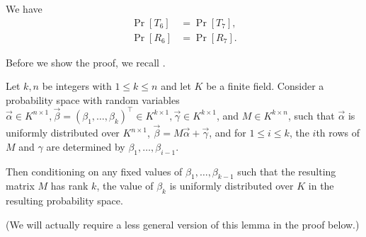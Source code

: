 \begin{lemma} We have
	\label{lem:t6t7}
	\begin{align*}
		\Pr[T_6] &= \Pr[T_7],\\
		\Pr[R_6] &= \Pr[R_7].
	\end{align*}
\end{lemma}

Before we show the proof, we recall \cite[Lemma~9]{cs01}.

\begin{lemma}
	\label{lem:independence}
	Let $k,n$ be integers with $1\leq k\leq n$ and let $K$ be a finite field. Consider a probability space with random variables $\vec{\alpha}\in K^{n\times 1}, \vec{\beta}=(\beta_1,\dots,\beta_k)^\top\in K^{k\times 1},\vec{\gamma}\in K^{k\times 1}$, and $M\in K^{k\times n}$, such that $\vec{\alpha}$ is uniformly distributed over $K^{n\times 1}$, $\vec{\beta}=M\vec{\alpha}+\vec{\gamma}$, and for $1\leq i\leq k$, the $i$th rows of $M$ and $\gamma$ are determined by $\beta_1,\dots,\beta_{i-1}$. 
	
	Then conditioning on any fixed values of $\beta_1,\dots,\beta_{k-1}$ such that the resulting matrix $M$ has rank $k$, the value of $\beta_k$ is uniformly distributed over $K$ in the resulting probability space.
\end{lemma}
(We will actually require a less general version of this lemma in the proof below.)

